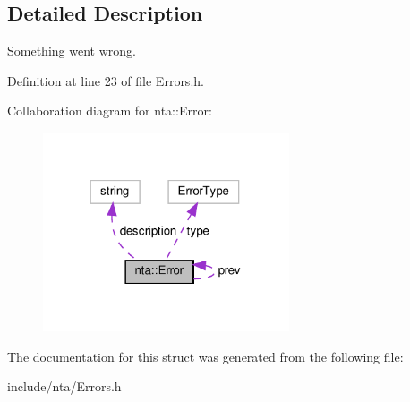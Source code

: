 \subsection{Detailed Description}
Something went wrong. 

Definition at line 23 of file Errors.\+h.



Collaboration diagram for nta\+:\+:Error\+:\nopagebreak
\begin{figure}[H]
\begin{center}
\leavevmode
\includegraphics[width=206pt]{d7/dbb/structnta_1_1Error__coll__graph}
\end{center}
\end{figure}


The documentation for this struct was generated from the following file\+:\begin{DoxyCompactItemize}
\item 
include/nta/Errors.\+h\end{DoxyCompactItemize}
